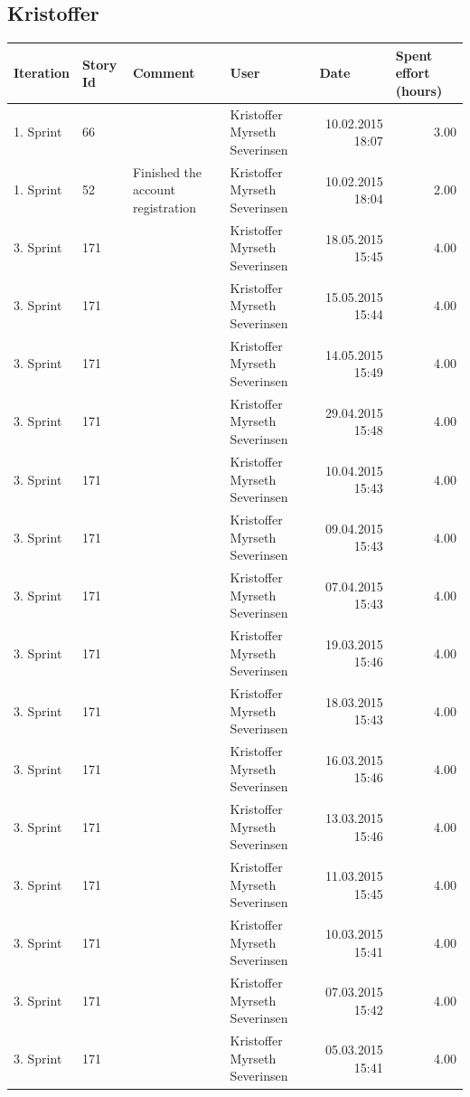 \documentclass[a4paper]{article}
\begin{document}
\begin{landscape}
\subsection{Kristoffer}
\begin{tabular}{|l|l|l|l|r|r|}
\hline
\textbf{Iteration} & \textbf{Story Id} & \textbf{Comment} & \textbf{User} & \multicolumn{1}{l|}{\textbf{Date}} & \multicolumn{1}{l|}{\textbf{Spent effort (hours)}} \\ \hline
1. Sprint & 66 &  & Kristoffer Myrseth Severinsen & 10.02.2015 18:07 & 3.00 \\ \hline
1. Sprint & 52 & Finished the account registration & Kristoffer Myrseth Severinsen & 10.02.2015 18:04 & 2.00 \\ \hline
3. Sprint & 171 &  & Kristoffer Myrseth Severinsen & 18.05.2015 15:45 & 4.00 \\ \hline
3. Sprint & 171 &  & Kristoffer Myrseth Severinsen & 15.05.2015 15:44 & 4.00 \\ \hline
3. Sprint & 171 &  & Kristoffer Myrseth Severinsen & 14.05.2015 15:49 & 4.00 \\ \hline
3. Sprint & 171 &  & Kristoffer Myrseth Severinsen & 29.04.2015 15:48 & 4.00 \\ \hline
3. Sprint & 171 &  & Kristoffer Myrseth Severinsen & 10.04.2015 15:43 & 4.00 \\ \hline
3. Sprint & 171 &  & Kristoffer Myrseth Severinsen & 09.04.2015 15:43 & 4.00 \\ \hline
3. Sprint & 171 &  & Kristoffer Myrseth Severinsen & 07.04.2015 15:43 & 4.00 \\ \hline
3. Sprint & 171 &  & Kristoffer Myrseth Severinsen & 19.03.2015 15:46 & 4.00 \\ \hline
3. Sprint & 171 &  & Kristoffer Myrseth Severinsen & 18.03.2015 15:43 & 4.00 \\ \hline
3. Sprint & 171 &  & Kristoffer Myrseth Severinsen & 16.03.2015 15:46 & 4.00 \\ \hline
3. Sprint & 171 &  & Kristoffer Myrseth Severinsen & 13.03.2015 15:46 & 4.00 \\ \hline
3. Sprint & 171 &  & Kristoffer Myrseth Severinsen & 11.03.2015 15:45 & 4.00 \\ \hline
3. Sprint & 171 &  & Kristoffer Myrseth Severinsen & 10.03.2015 15:41 & 4.00 \\ \hline
3. Sprint & 171 &  & Kristoffer Myrseth Severinsen & 07.03.2015 15:42 & 4.00 \\ \hline
3. Sprint & 171 &  & Kristoffer Myrseth Severinsen & 05.03.2015 15:41 & 4.00 \\ \hline

\end{tabular}
\end{landscape}
\end{document}

